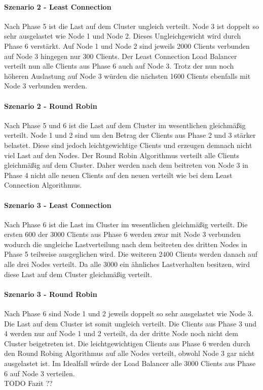 \paragraph{Szenario 2 - Least Connection}
Nach Phase 5 ist die Last auf dem Cluster ungleich verteilt. Node 3 ist doppelt so sehr ausgelastet wie Node 1 und Node 2. Dieses Ungleichgewicht wird durch Phase 6 verstärkt. Auf Node 1 und Node 2 sind jeweils 2000 Clients verbunden auf Node 3 hingegen nur 300 Clients. Der Least Connection Load Balancer verteilt nun alle Clients aus Phase 6 auch auf Node 3. Trotz der nun noch höheren Auslastung auf Node 3 würden die nächsten 1600 Clients ebenfalls mit Node 3 verbunden werden.

\paragraph{Szenario 2 - Round Robin}
Nach Phase 5 und 6 ist die Last auf dem Cluster im wesentlichen gleichmä{\ss}ig verteilt. Node 1 und 2 sind um den Betrag der Clients aus Phase 2 und 3 stärker belastet. Diese sind jedoch leichtgewichtige Clients und erzeugen demnach nicht viel Last auf den Nodes.
Der Round Robin Algorithmus verteilt alle Clients gleichmä{\ss}ig auf dem Cluster. Daher werden nach dem beitreten von Node 3 in Phase 4 nicht alle neuen Clients auf den neuen verteilt wie bei dem Least Connection Algorithmus.

\paragraph{Szenario 3 - Least Connection}
Nach Phase 6 ist die Last im Cluster im wesentlichen gleichmä{\ss}ig verteilt. Die ersten 600 der 3000 Clients aus Phase 6 werden zwar mit Node 3 verbunden wodurch die ungleiche Lastverteilung nach dem beitreten des dritten Nodes in Phase 5 teilweise ausgeglichen wird. Die weiteren 2400 Clients werden danach auf alle drei Nodes verteilt. Da alle 3000 ein ähnliches Lastverhalten besitzen, wird diese Last auf dem Cluster gleichmä{\ss}ig verteilt.

\paragraph{Szenario 3 - Round Robin}
Nach Phase 6 sind Node 1 und 2 jeweils doppelt so sehr ausgelastet wie Node 3. Die Last auf dem Cluster ist somit ungleich verteilt. Die Clients aus Phase 3 und 4 werden nur auf Node 1 und 2 verteilt, da der dritte Node noch nicht dem Cluster beigetreten ist. Die leichtgewichtigen Clients aus Phase 6 werden durch den Round Robing Algorithmus auf alle Nodes verteilt, obwohl Node 3 gar nicht ausgelastet ist. Im Idealfall würde der Load Balancer alle 3000 Clients aus Phase 6 auf Node 3 verteilen.
\\
TODO Fazit ??

